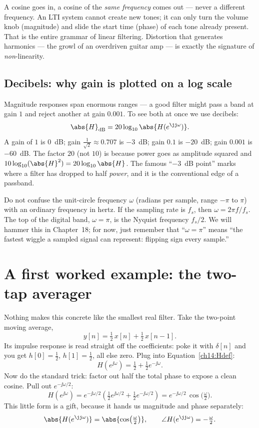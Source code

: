 \begin{intuitionbox}
A cosine goes in, a cosine of the \emph{same frequency} comes out --- never a
different frequency. An LTI system cannot create new tones; it can only turn the
volume knob (magnitude) and slide the start time (phase) of each tone already
present. That is the entire grammar of linear filtering. Distortion that
generates harmonics --- the growl of an overdriven guitar amp --- is exactly the
signature of \emph{non}-linearity.
\end{intuitionbox}

\subsection{Decibels: why gain is plotted on a log scale}

Magnitude responses span enormous ranges --- a good filter might pass a band at
gain $1$ and reject another at gain $0.001$. To see both at once we use
decibels:
\[
  \abs{H}_{\text{dB}} = 20\log_{10}\abs{H(e^{\jj\omega})}.
\]
A gain of $1$ is $0$~dB; gain $\tfrac{1}{\sqrt2}\approx 0.707$ is $-3$~dB; gain
$0.1$ is $-20$~dB; gain $0.001$ is $-60$~dB. The factor $20$ (not $10$) is
because power goes as amplitude squared and
$10\log_{10}(\abs{H}^2)=20\log_{10}\abs{H}$. The famous ``$-3$~dB point'' marks
where a filter has dropped to half \emph{power}, and it is the conventional edge
of a passband.

\begin{trapbox}
Do not confuse the unit-circle frequency $\omega$ (radians per sample, range
$-\pi$ to $\pi$) with an ordinary frequency in hertz. If the sampling rate is
$f_s$, then $\omega = 2\pi f / f_s$. The top of the digital band, $\omega=\pi$,
is the Nyquist frequency $f_s/2$. We will hammer this in Chapter~18; for now,
just remember that ``$\omega = \pi$'' means ``the fastest wiggle a sampled
signal can represent: flipping sign every sample.''
\end{trapbox}

\section{A first worked example: the two-tap averager}
\label{ch14:avg}

Nothing makes this concrete like the smallest real filter. Take the
two-point moving average,
\[
  y[n] = \tfrac12\,x[n] + \tfrac12\,x[n-1].
\]
Its impulse response is read straight off the coefficients: poke it with
$\delta[n]$ and you get $h[0]=\tfrac12$, $h[1]=\tfrac12$, all else zero. Plug
into Equation~\eqref{ch14:Hdef}:
\[
  H(e^{\jj\omega}) = \tfrac12 + \tfrac12 e^{-\jj\omega}.
\]
Now do the standard trick: factor out half the total phase to expose a clean
cosine. Pull out $e^{-\jj\omega/2}$:
\[
  H(e^{\jj\omega})
   = e^{-\jj\omega/2}\left(\tfrac12 e^{\jj\omega/2} + \tfrac12 e^{-\jj\omega/2}\right)
   = e^{-\jj\omega/2}\,\cos\!\big(\tfrac{\omega}{2}\big).
\]
This little form is a gift, because it hands us magnitude and phase separately:
\[
  \abs{H(e^{\jj\omega})} = \abs{\cos\!\big(\tfrac{\omega}{2}\big)},
  \qquad
  \angle H(e^{\jj\omega}) = -\tfrac{\omega}{2}.
\]

